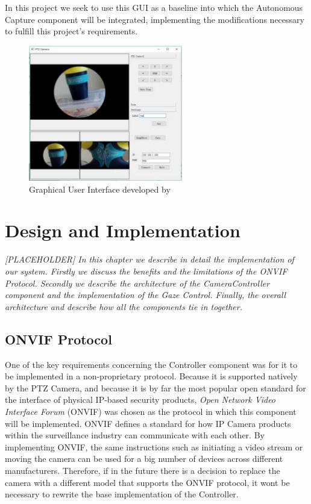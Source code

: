 \documentclass{l4proj}
\begin{document}
In this project we seek to use this GUI as a baseline into which the Autonomous Capture component will be integrated, implementing the modifications necessary to fulfill this project's requirements. 

\begin{figure}[ht]
    \centering
    \includegraphics[width=0.6\textwidth]{l4template-master/images/old_gui_temp.png}
    \caption{Graphical User Interface developed by \cite{JianwenZhou}}
    \label{oldgui}
\end{figure}


\chapter{Design and Implementation}

\textit{[PLACEHOLDER] In this chapter we describe in detail the implementation of our system. Firstly we discuss the benefits and the limitations of the ONVIF Protocol. Secondly we describe the architecture of the CameraController component and the implementation of the Gaze Control. Finally, the overall architecture and describe how all the components tie in together.}

\section{ONVIF Protocol}

One of the key requirements concerning the Controller component was for it to be implemented in a non-proprietary protocol. Because it is supported natively by the PTZ Camera, and because it is by far the most popular open standard for the interface of physical IP-based security products, \textit{Open Network Video Interface Forum} (ONVIF) was chosen as the protocol in which this component will be implemented. ONVIF defines a standard for how IP Camera products within the surveillance industry can communicate with each other. By implementing ONVIF, the same instructions such as initiating a video stream or moving the camera can be used for a big number of devices across different manufacturers. Therefore, if in the future there is a decision to replace the camera with a different model that supports the ONVIF protocol, it wont be necessary to rewrite the base implementation of the Controller. 
\end{document}
